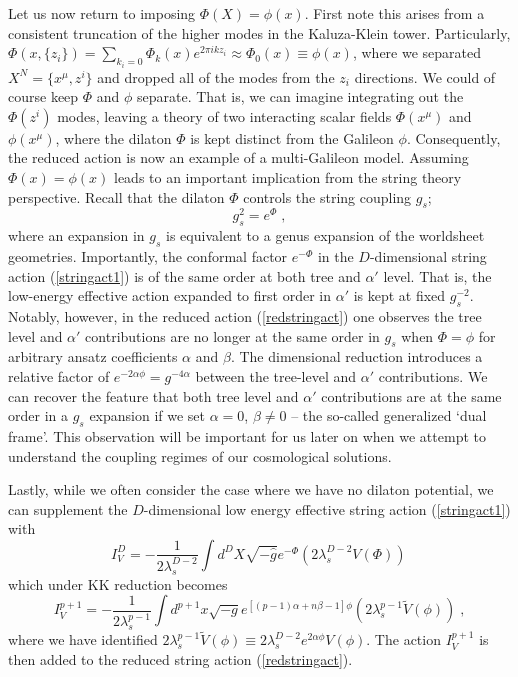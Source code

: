 \documentclass[amsmath,amssymb,11pt]{article}
\newcommand{\beq}{\begin{equation}}
\newcommand{\eeq}{\end{equation}}
\begin{document}
Let us now return to imposing $\Phi(X)=\phi(x)$. First note this arises from a consistent truncation of the higher modes in the Kaluza-Klein tower. Particularly, $\Phi(x,\{z_{i}\})=\sum_{k_{i}=0}\Phi_{k}(x)e^{2\pi i kz_{i}}\approx\Phi_{0}(x)\equiv\phi(x)$, where we separated $X^{N}=\{x^{\mu},z^{i}\}$ and dropped all of the modes from the $z_{i}$ directions. We could of course keep $\Phi$ and $\phi$ separate. That is, we can imagine integrating out the $\Phi(z^{i})$ modes, leaving a theory of two interacting scalar fields $\Phi(x^{\mu})$ and $\phi(x^{\mu})$, where the dilaton $\Phi$ is kept distinct from the Galileon $\phi$. Consequently, the reduced action is now an example of a multi-Galileon model. Assuming $\Phi(x)=\phi(x)$ leads to an important implication from the string theory perspective. Recall that the dilaton $\Phi$ controls the string coupling $g_{s}$;
\beq g_{s}^{2}=e^{\Phi}\;,\eeq
where an expansion in $g_{s}$ is equivalent to a genus expansion of the worldsheet geometries. Importantly, the conformal factor $e^{-\Phi}$ in the $D$-dimensional string action (\ref{stringact1}) is of the same order at both tree and $\alpha'$ level. That is, the low-energy effective action expanded to first order in $\alpha'$ is kept at fixed $g_{s}^{-2}$. Notably, however, in the reduced action (\ref{redstringact}) one observes the tree level and $\alpha'$ contributions are no longer at the same order in $g_{s}$ when $\Phi=\phi$ for arbitrary ansatz coefficients $\alpha$ and $\beta$. The dimensional reduction introduces a relative factor of $e^{-2\alpha\phi}=g^{-4\alpha}$ between the tree-level and $\alpha'$ contributions. We can recover the feature that both tree level and $\alpha'$ contributions are at the same order in a $g_{s}$ expansion if we set $\alpha=0$, $\beta\neq0$ -- the so-called generalized `dual frame'. This observation will be important for us later on when we attempt to understand the coupling regimes of our cosmological solutions. 



Lastly, while we often consider the case where we have no dilaton potential, we can supplement the $D$-dimensional low energy effective string action (\ref{stringact1}) with 
\beq I^{D}_{V}=-\frac{1}{2\lambda_{s}^{D-2}}\int d^{D}X\sqrt{-\hat{g}}e^{-\Phi}(2\lambda^{D-2}_{s}V(\Phi))\,\eeq
which under KK reduction becomes 
\beq I_{V}^{p+1}=-\frac{1}{2\lambda_{s}^{p-1}}\int d^{p+1}x\sqrt{-g}e^{[(p-1)\alpha+n\beta-1]\phi}(2\lambda^{p-1}_{s}\tilde{V}(\phi))\;,\eeq
where we have identified $2\lambda^{p-1}_{s}\tilde{V}(\phi)\equiv 2\lambda^{D-2}_{s}e^{2\alpha\phi}V(\phi)$. The action $I_{V}^{p+1}$ is then added to the reduced string action (\ref{redstringact}).
\end{document}
